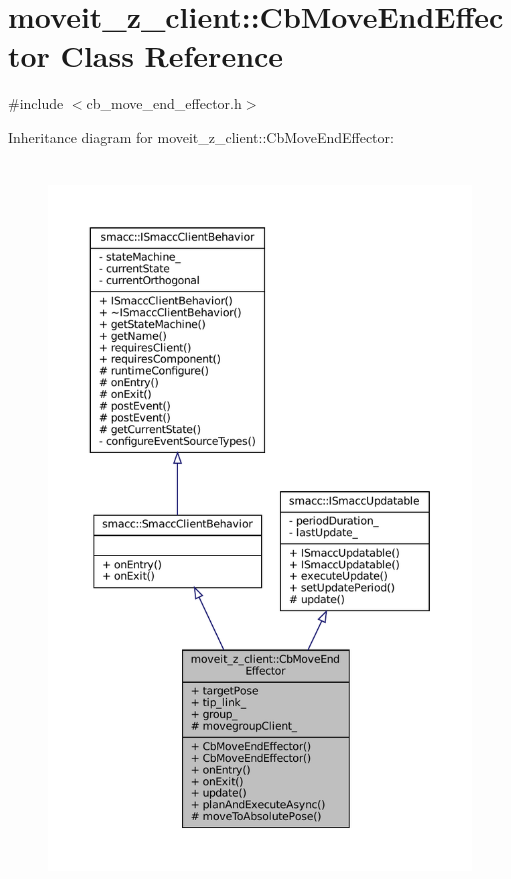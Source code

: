 \hypertarget{classmoveit__z__client_1_1CbMoveEndEffector}{}\section{moveit\+\_\+z\+\_\+client\+:\+:Cb\+Move\+End\+Effector Class Reference}
\label{classmoveit__z__client_1_1CbMoveEndEffector}


{\ttfamily \#include $<$cb\+\_\+move\+\_\+end\+\_\+effector.\+h$>$}



Inheritance diagram for moveit\+\_\+z\+\_\+client\+:\+:Cb\+Move\+End\+Effector\+:
\nopagebreak
\begin{figure}[H]
\begin{center}
\leavevmode
\includegraphics[height=550pt]{classmoveit__z__client_1_1CbMoveEndEffector__inherit__graph}
\end{center}
\end{figure}


